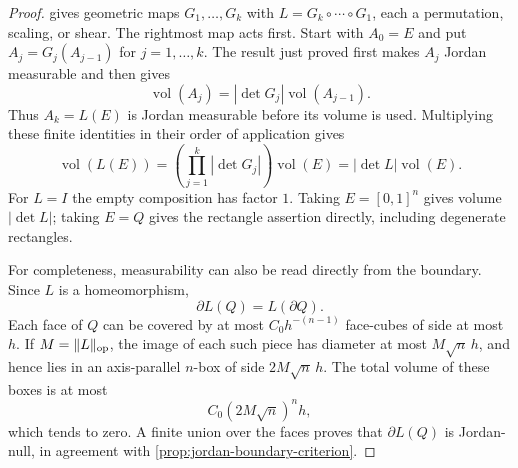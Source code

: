 \begin{proof}
 gives geometric maps $G_1,\ldots,G_k$
with $L=G_k\circ\cdots\circ G_1$, each a permutation, scaling, or shear.
The rightmost map acts first. Start with $A_0=E$ and put
$A_j=G_j(A_{j-1})$ for $j=1,\ldots,k$. The result just proved first
makes $A_j$ Jordan measurable and then gives
\[
\operatorname{vol}(A_j)=|\det G_j|\operatorname{vol}(A_{j-1}).
\]
Thus $A_k=L(E)$ is Jordan measurable before its volume is used. Multiplying
these finite identities in their order of application gives
\[
\operatorname{vol}(L(E))=\left(\prod_{j=1}^k|\det G_j|\right)
\operatorname{vol}(E)=|\det L|\operatorname{vol}(E).
\]
For $L=I$ the empty composition has factor $1$.
Taking $E=[0,1]^n$ gives volume $|\det L|$; taking $E=Q$ gives the
rectangle assertion directly, including degenerate rectangles.

For completeness, measurability can also be read directly from the boundary.
Since \(L\) is a homeomorphism,
\[
\partial L(Q)=L(\partial Q).
\]
Each face of \(Q\) can be covered by at most \(C_0h^{-(n-1)}\) face-cubes of
side at most \(h\).  If \(M=\lVert L\rVert_{\mathrm{op}}\), the image of each such
piece has diameter at most \(M\sqrt n\,h\), and hence lies in an
axis-parallel \(n\)-box of side \(2M\sqrt n\,h\).  The total volume of these
boxes is at most
\[
C_0(2M\sqrt n)^nh,
\]
which tends to zero.  A finite union over the faces proves that
\(\partial L(Q)\) is Jordan-null, in agreement with
\cref{prop:jordan-boundary-criterion}.
\end{proof}

